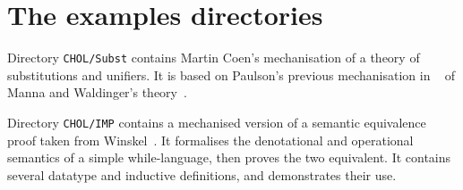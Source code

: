   \underscoreoff


\section{The examples directories}
Directory {\tt CHOL/Subst} contains Martin Coen's mechanisation of a theory of
substitutions and unifiers.  It is based on Paulson's previous
mechanisation in {\LCF}~\cite{paulson85} of Manna and Waldinger's
theory~\cite{mw81}. 

Directory {\tt CHOL/IMP} contains a mechanised version of a semantic
equivalence proof taken from Winskel~\cite{winskel93}.  It formalises the
denotational and operational semantics of a simple while-language, then
proves the two equivalent.  It contains several datatype and inductive
definitions, and demonstrates their use.

